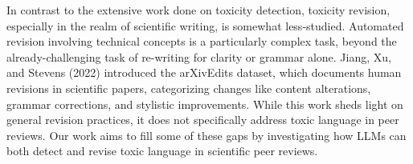 In contrast to the extensive work done on toxicity detection, toxicity revision, especially in the realm of scientific writing, is somewhat less-studied. Automated revision involving technical concepts is a particularly complex task, beyond the already-challenging task of re-writing for clarity or grammar alone. Jiang, Xu, and Stevens (2022) introduced the arXivEdits dataset, which documents human revisions in scientific papers, categorizing changes like content alterations, grammar corrections, and stylistic improvements. While this work sheds light on general revision practices, it does not specifically address toxic language in peer reviews. Our work aims to fill some of these gaps by investigating how LLMs can both detect and revise toxic language in scientific peer reviews.

